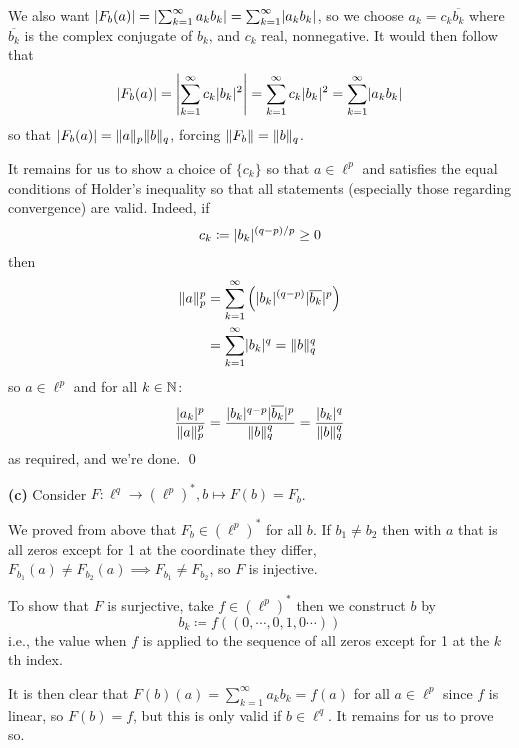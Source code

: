 \documentclass[a4paper, 10pt]{article}
\begin{document}
\begin{solution}
    We also want $\abs{F_b(a)} = \abs{\sum_{k=1}^{\infty} a_k b_k} = \sum_{k=1}^{\infty} \abs{a_k b_k}$, so we choose $a_k = c_k \overline{b_k}$ where $\overline{b_k}$ is the complex conjugate of $b_k$, and $c_k$ real, nonnegative. It would then follow that 
\begin{equation*}
    \abs{F_b(a)} = \abs*{\sum_{k=1}^{\infty} c_k \abs{b_k}^2} = \sum_{k=1}^{\infty} c_k \abs{b_k}^2 = \sum_{k=1}^{\infty} \abs{a_k b_k}
\end{equation*}
so that $\abs{F_b(a)} = \norm{a}_p \norm{b}_q$, forcing $\norm{F_b} = \norm{b}_q$.

It remains for us to show a choice of $\{c_k\}$ so that $a \in \ell^p$ and satisfies the equal conditions of Holder's inequality so that all statements (especially those regarding convergence) are valid. Indeed, if \begin{equation*}
c_k \coloneqq \abs{b_k}^{(q-p)/p} \geq 0
\end{equation*}
then \begin{align*}
\norm{a}_p^p &= \sum_{k=1}^{\infty} \left(\abs{b_k}^{(q-p)} \abs{\overline{b_k}}^p\right) \\
&= \sum_{k=1}^{\infty} \abs{b_k}^q = \norm{b}_q^q
\end{align*}
so $a \in \ell^p$ and for all $k \in \bbn$:\begin{equation*}
    \frac{\abs{a_k}^p}{\norm{a}_p^p} = \frac{\abs{b_k}^{q-p} \abs{\overline{b_k}}^p}{\norm{b}_q^q} = \frac{\abs{b_k}^q}{\norm{b}_q^q}
\end{equation*}
as required, and we're done. \qed


    \textbf{(c)} Consider $F: \ell^q \to (\ell^p)^*, b \mapsto F(b) = F_b$.

    We proved from above that $F_b \in (\ell^p)^*$ for all $b$. If $b_1 \neq b_2$ then with $a$ that is all zeros except for 1 at the coordinate they differ, $F_{b_1}(a) \neq F_{b_2}(a) \implies F_{b_1} \neq F_{b_2}$, so $F$ is injective.

    To show that $F$ is surjective, take $f \in (\ell^p)^*$ then we construct $b$ by \begin{equation*}
    b_k \coloneqq f((0, \cdots, 0,1,0 \cdots ))
    \end{equation*}
    i.e., the value when $f$ is applied to the sequence of all zeros except for 1 at the $k$th index.

    It is then clear that $F(b)(a) = \sum_{k=1}^{\infty} a_k b_k = f(a)$ for all $a \in \ell^p$ since $f$ is linear, so $F(b) = f$, but this is only valid if $b \in \ell^q$. It remains for us to prove so.


\end{solution}
\end{document}
